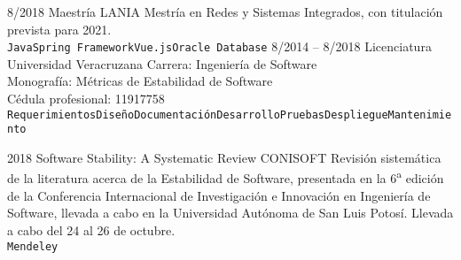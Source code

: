 \documentclass[9pt]{developercv} %
\begin{document}

\begin{entrylist}
	\entry
		{8/2018}
		{Maestría}
		{LANIA}
        {Mestría en Redes y Sistemas Integrados, con titulación prevista para 2021.\\
        \texttt{Java}\slashsep\texttt{Spring Framework}\slashsep\texttt{Vue.js}\slashsep\texttt{Oracle Database}}
	\entry
		{8/2014 -- 8/2018}
		{Licenciatura}
		{Universidad Veracruzana}
        {Carrera: Ingeniería de Software\\
        Monografía: Métricas de Estabilidad de Software\\
        Cédula profesional: 11917758\\
        \texttt{Requerimientos}\slashsep\texttt{Diseño}\slashsep\texttt{Documentación}\slashsep\texttt{Desarrollo}\slashsep\texttt{Pruebas}\slashsep\texttt{Despliegue}\slashsep\texttt{Mantenimiento}}
\end{entrylist}



\begin{entrylist}
	\entry
		{2018}
		{Software Stability: A Systematic Review}
		{CONISOFT}
        {Revisión sistemática de la literatura acerca de la Estabilidad de Software, presentada en la 6\textsuperscript{a} edición de la Conferencia Internacional de Investigación e Innovación en Ingeniería de Software, llevada a cabo en la Universidad Autónoma de San Luis Potosí. Llevada a cabo del 24 al 26 de octubre.\\
        \texttt{Mendeley}}
\end{entrylist}



\end{document}
